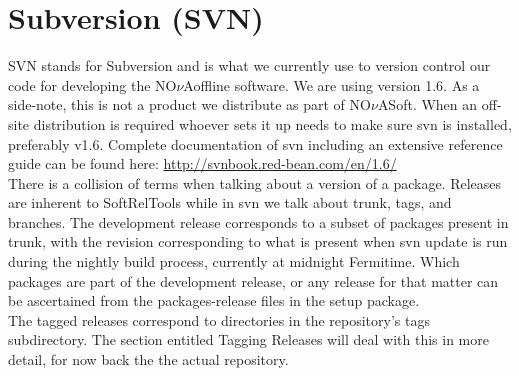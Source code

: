 \documentclass[letterpaper,10pt]{article}
\newcommand{\nova}{NO$\nu$A}
\newcommand{\novas}{\nova \space}
\begin{document}
\section{Subversion (SVN)}

SVN stands for Subversion and is what we currently use to version control our code for developing the \novas  offline software. We are using version 1.6. As a side-note, this is not a product we distribute as part of \nova Soft. When an off-site distribution is required whoever sets it up needs to make sure svn is installed, preferably v1.6. Complete documentation of svn including an extensive reference guide can be found here:
\url{http://svnbook.red-bean.com/en/1.6/}\\

\noindent
There is a collision of terms when talking about a version of a package. Releases are inherent to SoftRelTools while in svn we talk about trunk, tags, and branches. The development release corresponds to a subset of packages present in trunk, with the revision corresponding to what is present when svn update is run during the nightly build process, currently at midnight Fermitime. Which packages are part of the development release, or any release for that matter can be ascertained from the packages-release files in the setup package.\\


\noindent
The tagged releases correspond to directories in the repository's tags subdirectory. The section entitled Tagging Releases will deal with this in more detail, for now back the the actual repository.\\
\end{document}
